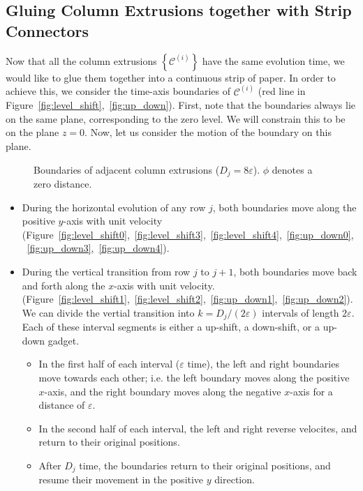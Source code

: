 \subsection{Gluing Column Extrusions together with Strip Connectors}
\label{sec:strip_connectors}
Now that all the column extrusions $\left\{ \mathcal C^{(i)} \right\}$ have the same evolution time,
we would like to glue them together into a continuous strip of paper.
In order to achieve this, we consider the time-axis boundaries of $\mathcal C^{(i)}$ (red line in Figure~\ref{fig:level_shift},~\ref{fig:up_down}).
First, note that the boundaries always lie on the same plane, corresponding to the zero level.
We will constrain this to be on the plane $z=0$. Now, let us consider the motion of the boundary on this plane.

\graphicspath{{./figures/}}
\begin{wrapfigure}[18]{r}{0.34\textwidth}
    \vspace{-2.8em}
    \def\svgwidth{0.33\textwidth}
    \caption{Boundaries of adjacent column extrusions ($D_j = 8\varepsilon$). $\phi$ denotes a zero distance.}
    \label{fig:boundaries}
\end{wrapfigure}
\begin{itemize}
    \item During the horizontal evolution of any row $j$, both boundaries move along the positive $y$-axis with unit velocity
          (Figure~\ref{fig:level_shift0},~\ref{fig:level_shift3},~\ref{fig:level_shift4},~\ref{fig:up_down0},~\ref{fig:up_down3},~\ref{fig:up_down4}).
    \item During the vertical transition from row $j$ to $j+1$, both boundaries move back and forth along the $x$-axis with unit velocity.
          (Figure~\ref{fig:level_shift1},~\ref{fig:level_shift2},~\ref{fig:up_down1},~\ref{fig:up_down2}).
          We can divide the vertial transition into $k = D_j/(2\varepsilon)$ intervals of length $2\varepsilon$.
          Each of these interval segments is either a up-shift, a down-shift, or a up-down gadget.
    \begin{itemize}
        \item In the first half of each interval ($\varepsilon$ time), the left and right boundaries move towards each other;
              i.e. the left boundary moves along the positive $x$-axis,
              and the right boundary moves along the negative $x$-axis for a distance of $\varepsilon$.
        \item In the second half of each interval, the left and right reverse velocites, and return to their original positions.
        \item After $D_j$ time, the boundaries return to their original positions, and resume their movement in the positive $y$ direction.
    \end{itemize}
\end{itemize}

